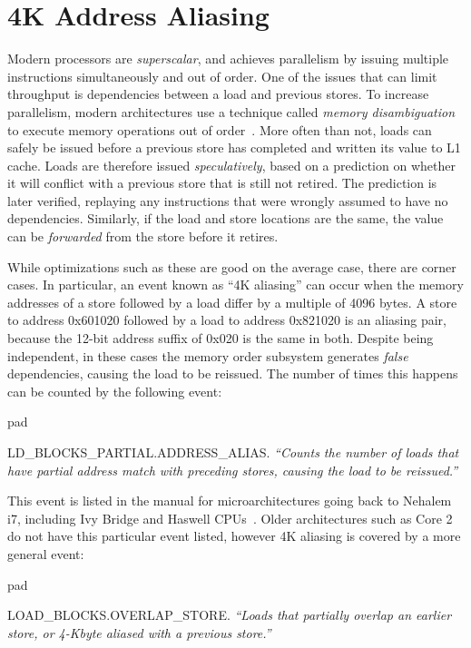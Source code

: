 \documentclass[prodmode,acmtaco]{acmsmall}
\begin{document}
\section{4K Address Aliasing}
\label{sec:aliasing}
Modern processors are \emph{superscalar}, and achieves parallelism by issuing multiple instructions simultaneously and out of order.
One of the issues that can limit throughput is dependencies between a load and previous stores.
To increase parallelism, modern architectures use a technique called \emph{memory disambiguation} to execute memory operations out of order~\cite{Intel:2006:InsideICM:SmartMemoryAccess}. 
More often than not, loads can safely be issued before a previous store has completed and written its value to L1 cache.
Loads are therefore issued \emph{speculatively}, based on a prediction on whether it will conflict with a previous store that is still not retired.
The prediction is later verified, replaying any instructions that were wrongly assumed to have no dependencies.
Similarly, if the load and store locations are the same, the value can be \emph{forwarded} from the store before it retires.

While optimizations such as these are good on the average case, there are corner cases. 
In particular, an event known as ``4K aliasing'' can occur when the memory addresses of a store followed by a load differ by a multiple of 4096 bytes.
A store to address 0x601020 followed by a load to address 0x821020 is an aliasing pair, because the 12-bit address suffix of 0x020 is the same in both. 
Despite being independent, in these cases the memory order subsystem generates \emph{false} dependencies, causing the load to be reissued.
The number of times this happens can be counted by the following event:
\begin{describe}{{pad}}
  \item[{\small LD\_BLOCKS\_PARTIAL.ADDRESS\_ALIAS.}] \emph{``Counts the number of loads that have partial address match with preceding stores, causing the load to be reissued.''} \cite[B.3.4.4]{OptimizationManual}
\end{describe}
This event is listed in the manual for microarchitectures going back to Nehalem i7, including Ivy Bridge and Haswell CPUs~\cite{Volume3B}.
Older architectures such as Core 2 do not have this particular event listed, however 4K aliasing is covered by a more general event:
\begin{describe}{{pad}}
  \item[{\small LOAD\_BLOCKS.OVERLAP\_STORE.}] \emph{``Loads that partially overlap an earlier store, or 4-Kbyte aliased with a previous store.''} \cite[Table 19-17]{Volume3B}
\end{describe}
\end{document}
